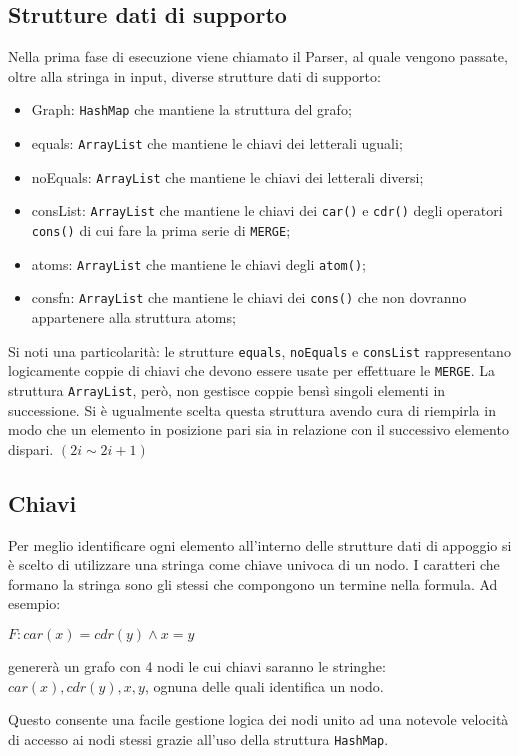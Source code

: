 \documentclass[a4paper,11pt]{article}
\begin{document}
\subsection{Strutture dati di supporto}
Nella prima fase di esecuzione viene chiamato il Parser, al quale vengono passate, oltre alla stringa in input, diverse strutture dati di supporto:
\begin{itemize}
	\item Graph: {\tt HashMap} che mantiene la struttura del grafo;
	\item equals: {\tt ArrayList} che mantiene le chiavi dei letterali uguali;
	\item noEquals: {\tt ArrayList} che mantiene le chiavi dei letterali diversi;
	\item consList: {\tt ArrayList} che mantiene le chiavi dei {\tt car()} e {\tt cdr()} degli operatori {\tt cons()} di cui fare la prima serie di {\tt MERGE};
	\item atoms: {\tt ArrayList} che mantiene le chiavi degli {\tt atom()};
	\item consfn: {\tt ArrayList} che mantiene le chiavi dei {\tt cons()} che non dovranno appartenere alla struttura atoms; 
\end{itemize}
Si noti una particolarità: le strutture {\tt equals}, {\tt noEquals} e {\tt consList} rappresentano logicamente coppie di chiavi che devono essere usate per effettuare le {\tt MERGE}.
La struttura {\tt ArrayList}, però, non gestisce coppie bensì singoli elementi in successione.
Si è ugualmente scelta questa struttura avendo cura di riempirla in modo che un elemento in posizione pari sia in relazione con il successivo elemento dispari. $(2i \sim 2i+1)$
\subsection{Chiavi}
Per meglio identificare ogni elemento all'interno delle strutture dati di appoggio si è scelto di utilizzare una stringa come chiave univoca di un nodo.
I caratteri che formano la stringa sono gli stessi che compongono un termine nella formula. Ad esempio:
\begin{center}
$F : car(x) = cdr(y) \wedge x = y $
\end{center}
genererà un grafo con 4 nodi le cui chiavi saranno le stringhe: $car(x),cdr(y),x,y$, ognuna delle quali identifica un nodo.

Questo consente una facile gestione logica dei nodi unito ad una notevole velocità di accesso ai nodi stessi grazie all'uso della struttura {\tt HashMap}.
\end{document}
